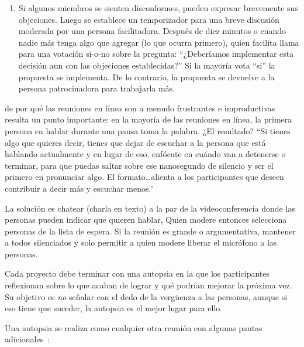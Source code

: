 \begin{enumerate}
\item
  Si algunos miembros se sienten disconformes, pueden expresar brevemente sus objeciones.
  Luego se establece un temporizador para una breve discusión moderada por una persona facilitadora.
  Después de diez minutos o cuando nadie más tenga algo que agregar (lo que ocurra primero),
  quien facilita llama para una votación si-o-no sobre la pregunta:
  ``¿Deberíamos implementar esta decisión aun con las objeciones establecidas?''
  Si la mayoría vota ``si'' la propuesta se implementa.
  De lo contrario, la propuesta se devuelve a la persona patrocinadora para trabajarla más.

\end{enumerate}


de por qué las reuniones en línea son a menudo frustrantes e improductivas 
resulta un punto importante:
en la mayoría de las reuniones en línea,
la primera persona en hablar durante una pausa toma la palabra.
¿El resultado?
``Si tienes algo que quieres decir,
tienes que dejar de escuchar a la persona que está hablando actualmente
y en lugar de eso, enfócate en cuándo van a detenerse o terminar, 
para que puedas saltar sobre ese nanosegundo de silencio y ser el primero en pronunciar algo.
El formato{\ldots}alienta a los participantes que deseen contribuir a decir más y escuchar menos.''

La solución es chatear (charla en texto) a la par de la videoconferencia
donde las personas pueden indicar que quieren hablar,
Quien modere entonces selecciona personas de la lista de espera.
Si la reunión es grande o argumentativa,
mantener a todos silenciados
y solo permitir a quien modere liberar el micrófono a las personas.


Cada proyecto debe terminar con una autopsia
en la que los participantes reflexionan sobre lo que acaban de lograr
y qué podrían mejorar la próxima vez.
Su objetivo es \emph{no} señalar con el dedo de la vergüenza a las personas,
aunque si eso tiene que suceder,
la autopsia es el mejor lugar para ello.

Una autopsia se realiza como cualquier otra reunión
con algunas pautas adicionales~\cite{Derb2006}:

